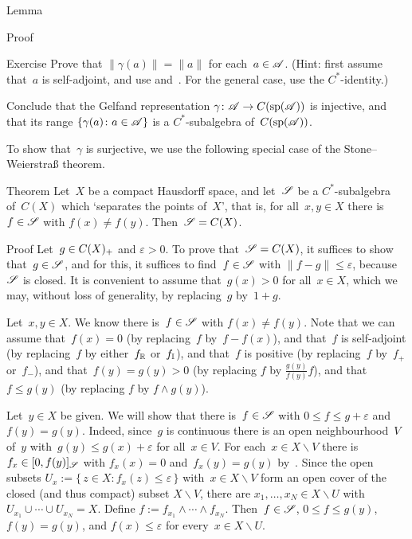 \documentclass[main]{subfiles}
\begin{document}
\begin{parsec}
\begin{point}{Lemma}
\begin{point}{Proof}
\end{point}
\end{point}
\begin{point}{Exercise}%
Prove that $\|\gamma(a)\|=\|a\|$
for each~$a\in\mathscr{A}$.
(Hint: first assume that~$a$ is self-adjoint,
and use  and~.
For the general case,
use the $C^*$-identity.)

Conclude that the Gelfand representation $\gamma\colon \mathscr{A}\to C(\mathrm{sp}(\mathscr{A}))$
is injective,
and that its range $\{\gamma(a)\colon a\in\mathscr{A}\}$
is a $C^*$-subalgebra of~$C(\mathrm{sp}(\mathscr{A}))$.
\end{point}
\begin{point}%
To show that~$\gamma$ is surjective,
we use the following special case of
the Stone--Weierstra\ss{} theorem. 
\end{point}
\begin{point}{Theorem}%
Let~$X$ be a compact Hausdorff space,
and let~$\mathscr{S}$ be a $C^*$-subalgebra of~$C(X)$
which `separates the points of~$X$',
that is, for all~$x,y\in X$
there is~$f\in \mathscr{S}$ with $f(x)\neq f(y)$.
Then~$\mathscr{S}=C(X)$.
\begin{point}{Proof}%
Let~$g\in C(X)_{+}$ and $\varepsilon >0$.
To prove that~$\mathscr{S}=C(X)$,
it suffices to show that~$g\in \mathscr{S}$,
and for this,
it suffices to find~$f\in \mathscr{S}$ with $\|f-g\|\leq \varepsilon$,
because~$\mathscr{S}$ is closed.
It is convenient to assume that~$g(x)> 0$ for all~$x\in X$,
which we may, without loss of generality,
by replacing~$g$ by~$1+g$.

\begin{point}%
Let~$x,y\in X$.
We know there is~$f\in \mathscr{S}$ with $f(x)\neq f(y)$.
Note that we can assume that~$f(x)=0$ (by replacing~$f$ by~$f-f(x)$),
and that~$f$ is self-adjoint (by replacing~$f$
by either~$f_{\mathbb{R}}$ or~$f_{\mathbb{I}}$),
and that~$f$ is positive
(by replacing~$f$ by~$f_+$ or~$f_-$),
and that~$f(y)=g(y)>0$
(by replacing $f$ by $\frac{g(y)}{f(y)} f$),
and that~$f\leq g(y)$
(by replacing $f$ by $f\wedge g(y)$).
\end{point}
\begin{point}%
Let~$y\in X$ be given.
We will show that there is~$f\in\mathscr{S}$
with $0\leq f\leq g+\varepsilon$
and~$f(y)=g(y)$.
Indeed,
since~$g$ is continuous
there is an open neighbourhood~$V$ of~$y$
with~$g(y) \leq  g(x)+\varepsilon$
for all~$x\in V$.
For each~$x\in X\backslash V$ there is $f_x \in [0,f(y)]_{\mathscr{S}}$
with $f_x(x)=0$ and~$f_x(y)=g(y)$ by~.
Since the open subsets
$U_x := \{\,z\in X\colon f_x(z)\leq \varepsilon\,\}$
with~$x\in X\backslash V$
form an open cover of the closed (and thus compact) subset $X\backslash V$,
there are $x_1,\dotsc,x_N\in X\backslash U$
with $U_{x_1}\cup\dotsb\cup U_{x_N}=X$.
Define $f:=f_{x_1}\wedge \dotsb \wedge f_{x_N}$.
Then~$f\in \mathscr{S}$, $0\leq f\leq g(y)$, $f(y)=g(y)$,
and $f(x)\leq \varepsilon$
for every~$x\in X\backslash U$.


\end{point}
\end{point}
\end{point}
\end{parsec}
\end{document}

